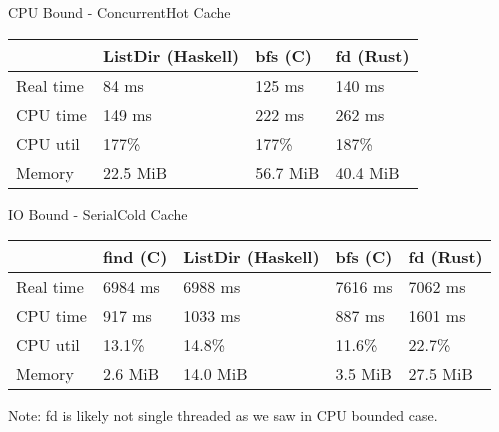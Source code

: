 \documentclass[17pt]{beamer}
\begin{document}
%

\begin{frame}{CPU Bound - Concurrent}{Hot Cache}
\tiny

\begin{tabular}{|l|l|l|l|}
\hline
  & ListDir (Haskell) & bfs (C) & fd (Rust) \\
\hline
  Real time & 84 ms & 125 ms & 140 ms \\
\hline
  CPU time & 149 ms & 222 ms & 262 ms \\
\hline
  CPU util & 177\% & 177\% & 187\% \\
\hline
  Memory & 22.5 MiB & 56.7 MiB & 40.4 MiB \\
\hline
\end{tabular}
\end{frame}

\begin{frame}{IO Bound - Serial}{Cold Cache}
\tiny

\begin{tabular}{|l|l|l|l|l|}
\hline
  & find (C)
  & ListDir (Haskell)
  & bfs (C)
  & fd (Rust)
  \\
\hline
  Real time
  & 6984 ms
  & 6988 ms
  & 7616 ms
  & 7062 ms
  \\
\hline
  CPU time
  & 917 ms
  & 1033 ms
  & 887 ms
  & 1601 ms
  \\
\hline
  CPU util
  & 13.1\%
  & 14.8\%
  & 11.6\%
  & 22.7\%
  \\
\hline
  Memory
  & 2.6 MiB
  & 14.0 MiB
  & 3.5 MiB
  & 27.5 MiB
  \\
\hline
\end{tabular}

Note: fd is likely not single threaded as we saw in CPU bounded case.

\end{frame}
\end{document}
